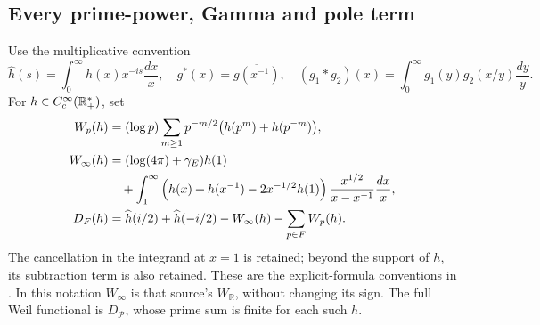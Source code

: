 \subsection{Every prime-power, Gamma and pole term}
Use the multiplicative convention
\[
 \widehat h(s)=\int_0^\infty h(x)x^{-is}\frac{dx}{x},\quad
 g^*(x)=\overline{g(x^{-1})},\quad
 (g_1*g_2)(x)=\int_0^\infty g_1(y)g_2(x/y)\frac{dy}{y}.
\]
For $h\in C_c^\infty(\mathbb R_+^*)$, set
\begin{align}
 W_p(h)&=(\log p)\sum_{m\ge1}p^{-m/2}\bigl(h(p^m)+h(p^{-m})\bigr),\label{eq:rebuilt-Wp}\\
 W_\infty(h)&=(\log(4\pi)+\gamma_E)h(1)\notag\\
 &\quad+\int_1^\infty\left(h(x)+h(x^{-1})-2x^{-1/2}h(1)\right)
 \frac{x^{1/2}}{x-x^{-1}}\frac{dx}{x},\label{eq:rebuilt-Winf}\\
 D_F(h)&=\widehat h(i/2)+\widehat h(-i/2)-W_\infty(h)-\sum_{p\in F}W_p(h).
 \label{eq:rebuilt-D}
\end{align}
The cancellation in the integrand at $x=1$ is retained; beyond the support of $h$, its subtraction term is also retained. These are the explicit-formula conventions in \cite[\texttt{wp}, \texttt{arch}, \texttt{sectweilpos}]{Connes2026}. In this notation $W_\infty$ is that source's $W_{\mathbb R}$, without changing its sign. The full Weil functional is $D_{\mathcal P}$, whose prime sum is finite for each such $h$.

